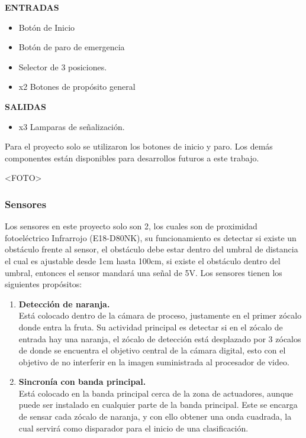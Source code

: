 \documentclass[twoside,spanish,ESP,MSc]{plantillaLabUPV}
\theoremstyle{definition}
\begin{document}
\textbf{ENTRADAS}
\begin{itemize}
	\item Botón de Inicio
	\item Botón de paro de emergencia
	\item Selector de 3 posiciones.
	\item x2 Botones de propósito general
\end{itemize}

\textbf{SALIDAS}
\begin{itemize}
	\item x3 Lamparas de señalización.
\end{itemize}

Para el proyecto solo se utilizaron los botones de inicio y paro. Los demás componentes están disponibles para desarrollos futuros a este trabajo.

<FOTO> 

\subsubsection{Sensores}
Los sensores en este proyecto solo son 2, los cuales son de proximidad fotoeléctrico Infrarrojo (E18-D80NK), su funcionamiento es detectar si existe un obstáculo frente al sensor, el obstáculo debe estar dentro del umbral de distancia el cual es ajustable desde 1cm hasta 100cm, si existe el obstáculo dentro del umbral, entonces el sensor mandará una señal de 5V. Los sensores tienen los siguientes propósitos:

\begin{enumerate}
	\item \textbf{Detección de naranja.}\\
	Está colocado dentro de la cámara de proceso, justamente en el primer zócalo donde entra la fruta. Su actividad principal es detectar si en el zócalo de entrada hay una naranja, el zócalo de detección está desplazado por 3 zócalos de donde se encuentra el objetivo central de la cámara digital, esto con el objetivo de no interferir en la imagen suministrada al procesador de video.
	\item \textbf{Sincronía con banda principal.}\\
	Está colocado en la banda principal cerca de la zona de actuadores, aunque puede ser instalado en cualquier parte de la banda principal. Este se encarga de sensar cada zócalo de naranja, y con ello obtener una onda cuadrada, la cual servirá como disparador para el inicio de una clasificación.
\end{enumerate} 
\end{document}
